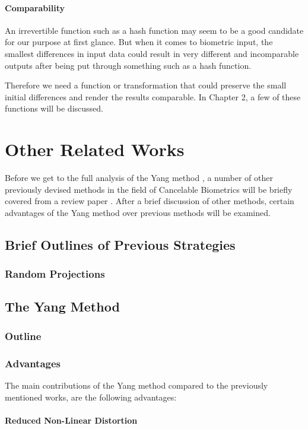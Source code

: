 \documentclass[fyp]{socreport}
\begin{document}
\subsubsection{Comparability}
An irrevertible function such as a hash function may seem to be a good candidate for our purpose at first glance. But when it comes to biometric input, the smallest differences in input data could result in very different and incomparable outputs after being put through something such as a hash function.

Therefore we need a function or transformation that could preserve the small initial differences and render the results comparable. In Chapter 2, a few of these functions will be discussed.

\chapter{Other Related Works}
Before we get to the full analysis of the Yang method \cite{wencheng18cbio}, a number of other previously devised methods in the field of Cancelable Biometrics will be briefly covered from a review paper \cite{kumar19cbio}. After a brief discussion of other methods, certain advantages of the Yang method over previous methods will be examined.



\section{Brief Outlines of Previous Strategies}
\subsection{Random Projections}

\section{The Yang Method}
\subsection{Outline}


\subsection{Advantages}
The main contributions of the Yang method compared to the previously mentioned works, are the following advantages:

\subsubsection{Reduced Non-Linear Distortion}
\end{document}
